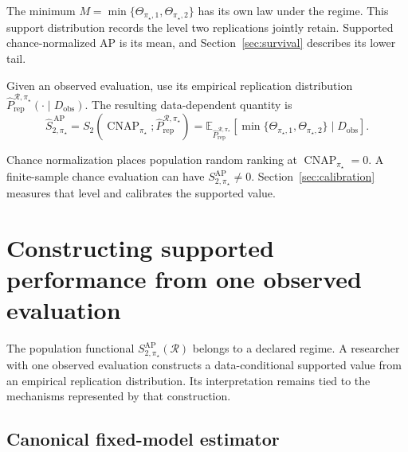 \documentclass[11pt]{article}
\newcommand{\CNAP}{\operatorname{CNAP}}
\newcommand{\Regime}{\mathcal{R}}
\newcommand{\Tpi}{\CNAP_{\pi_\star}}
\newcommand{\E}{\mathbb{E}}
\newcommand{\SAPfull}{S_{2,\pi_\star}^{\mathrm{AP}}(\Regime)}
\newcommand{\SAP}{S_{2,\pi_\star}^{\mathrm{AP}}}
\newcommand{\SAPHat}{\widehat S_{2,\pi_\star}^{\,\mathrm{AP}}}
\newcommand{\PRepHat}{\widehat{P}_{\mathrm{rep}}^{\Regime,\pi_\star}}
\theoremstyle{remark}
\begin{document}
\begin{center}
\end{center}

The minimum $M=\min\{\Theta_{\pi_\star,1},\Theta_{\pi_\star,2}\}$ has its own law under the regime. This support distribution records the level two replications jointly retain. Supported chance-normalized AP is its mean, and Section~\ref{sec:survival} describes its lower tail.

Given an observed evaluation, use its empirical replication distribution $\PRepHat(\cdot\mid D_{\mathrm{obs}})$. The resulting data-dependent quantity is
\begin{equation}
\SAPHat
=
S_2(\CNAP_{\pi_\star};\PRepHat)
=
\E_{\PRepHat}
\left[
\min\{
\Theta_{\pi_\star,1},
\Theta_{\pi_\star,2}
\}
\mid D_{\mathrm{obs}}
\right].
\label{eq:rcap-estimated}
\end{equation}

Chance normalization places population random ranking at $\Tpi=0$. A finite-sample chance evaluation can have $\SAP\ne0$. Section~\ref{sec:calibration} measures that level and calibrates the supported value.

\section{Constructing supported performance from one observed evaluation}
\label{sec:estimation}

The population functional $\SAPfull$ belongs to a declared regime. A researcher with one observed evaluation constructs a data-conditional supported value from an empirical replication distribution. Its interpretation remains tied to the mechanisms represented by that construction.

\subsection{Canonical fixed-model estimator}
\end{document}
